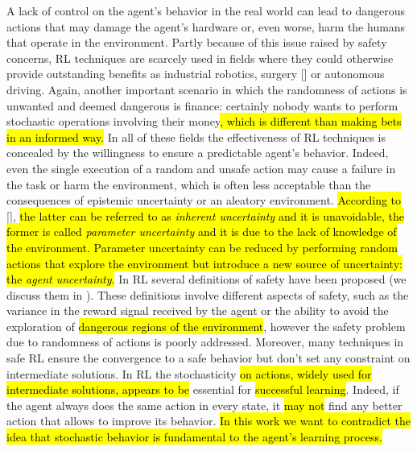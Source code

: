 A lack of control on the agent's behavior in the real world can lead to dangerous actions that may damage the agent's hardware or, even worse, harm the humans that operate in the environment. Partly because of this issue raised by safety concerns, \ac{RL} techniques are scarcely used in fields where they could otherwise provide outstanding benefits as industrial robotics, surgery [\cite{baek2018PathPlanning}] or autonomous driving. Again, another important scenario in which the randomness of actions is unwanted and deemed dangerous is finance: certainly nobody wants to perform stochastic operations involving their money\hl{, which is different than making bets in an informed way.} In all of these fields the effectiveness of \ac{RL} techniques is concealed by the willingness to ensure a predictable agent's behavior. Indeed, even the single execution of a random and unsafe action may cause a failure in the task or harm the environment, which is often less acceptable than the consequences of epistemic uncertainty or an aleatory environment. \hl{According to} [\cite{JMLR:v16:garcia15a}], \hl{the latter can be referred to as \emph{inherent uncertainty} and it is unavoidable, the former is called \emph{parameter uncertainty} and it is due to the lack of knowledge of the environment. Parameter uncertainty can be reduced by performing random actions that explore the environment but introduce a new source of uncertainty: the \emph{agent uncertainty}.} In \ac{RL} several definitions of safety have been proposed (we discuss them in ). These definitions involve different aspects of safety, such as the variance in the reward signal received by the agent or the ability to avoid the exploration of \hl{dangerous regions of the environment}, however the safety problem due to randomness of actions is poorly addressed. Moreover, many techniques in safe \ac{RL} ensure the convergence to a safe behavior but don't set any constraint on intermediate solutions. In \ac{RL} the stochasticity \hl{on actions, widely used for intermediate solutions, appears to be} essential for \hl{successful learning}. Indeed, if the agent always does the same action in every state, it \hl{may not} find any better action that allows to improve its behavior. \hl{In this work we want to contradict the idea that stochastic behavior is fundamental to the agent's learning process.}\\
\newline
